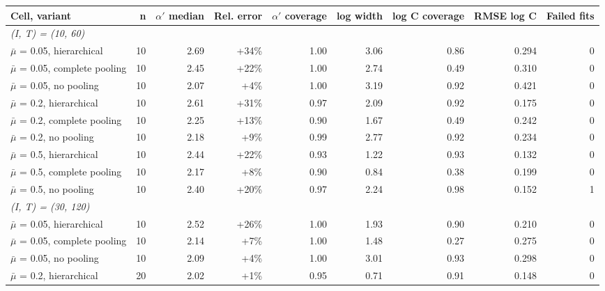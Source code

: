\documentclass[10pt,a4paper]{article}
\begin{document}
\noindent\begin{minipage}{\linewidth}
\label{tab:S5}
\centering\scriptsize
\begin{tabular}{lrrrrrrrr}
\toprule
Cell, variant & n & $\alpha'$ median & Rel. error & $\alpha'$ coverage & log width & log C coverage & RMSE log C & Failed fits \\ \midrule
\multicolumn{9}{l}{\itshape (I, T) = (10, 60)} \\
$\bar{\mu}$ = 0.05, hierarchical & 10 & 2.69 & +34\% & 1.00 & 3.06 & 0.86 & 0.294 & 0 \\
$\bar{\mu}$ = 0.05, complete pooling & 10 & 2.45 & +22\% & 1.00 & 2.74 & 0.49 & 0.310 & 0 \\
$\bar{\mu}$ = 0.05, no pooling & 10 & 2.07 & +4\% & 1.00 & 3.19 & 0.92 & 0.421 & 0 \\
$\bar{\mu}$ = 0.2, hierarchical & 10 & 2.61 & +31\% & 0.97 & 2.09 & 0.92 & 0.175 & 0 \\
$\bar{\mu}$ = 0.2, complete pooling & 10 & 2.25 & +13\% & 0.90 & 1.67 & 0.49 & 0.242 & 0 \\
$\bar{\mu}$ = 0.2, no pooling & 10 & 2.18 & +9\% & 0.99 & 2.77 & 0.92 & 0.234 & 0 \\
$\bar{\mu}$ = 0.5, hierarchical & 10 & 2.44 & +22\% & 0.93 & 1.22 & 0.93 & 0.132 & 0 \\
$\bar{\mu}$ = 0.5, complete pooling & 10 & 2.17 & +8\% & 0.90 & 0.84 & 0.38 & 0.199 & 0 \\
$\bar{\mu}$ = 0.5, no pooling & 10 & 2.40 & +20\% & 0.97 & 2.24 & 0.98 & 0.152 & 1 \\
\multicolumn{9}{l}{\itshape (I, T) = (30, 120)} \\
$\bar{\mu}$ = 0.05, hierarchical & 10 & 2.52 & +26\% & 1.00 & 1.93 & 0.90 & 0.210 & 0 \\
$\bar{\mu}$ = 0.05, complete pooling & 10 & 2.14 & +7\% & 1.00 & 1.48 & 0.27 & 0.275 & 0 \\
$\bar{\mu}$ = 0.05, no pooling & 10 & 2.09 & +4\% & 1.00 & 3.01 & 0.93 & 0.298 & 0 \\
$\bar{\mu}$ = 0.2, hierarchical & 20 & 2.02 & +1\% & 0.95 & 0.71 & 0.91 & 0.148 & 0 \\

\end{tabular}
\end{minipage}
\end{document}
